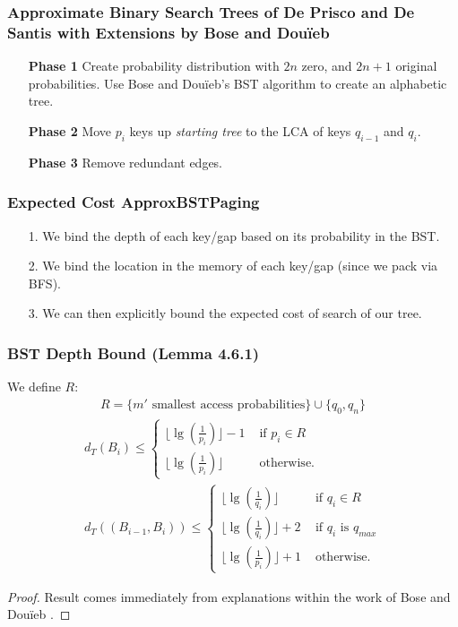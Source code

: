 \documentclass{beamer}
\theoremstyle{plain}
\begin{document}
\begin{frame} \frametitle{Approximate Binary Search Trees of De Prisco and De Santis with Extensions by Bose and Dou\"{i}eb} \label{sec:deBST}

\begin{itemize}
\item[\textbf{Phase 1}] Create probability distribution with $2n$ zero, and $2n+1$ original probabilities. Use Bose and Dou\"{i}eb's BST algorithm to create an alphabetic tree.

\item[\textbf{Phase 2}] Move $p_i$ keys up \textit{starting tree} to the LCA of keys $q_{i-1}$ and $q_i$.

\item[\textbf{Phase 3}] Remove redundant edges.
\end{itemize}
\end{frame}


\begin{frame} \frametitle{Expected Cost ApproxBSTPaging}\label{48}
\begin{itemize}
\item[1.] We bind the depth of each key/gap based on its probability in the BST.
\item[2.] We bind the location in the memory of each key/gap (since we pack via BFS).
\item[3.] We can then explicitly bound the expected cost of search of our tree.
\end{itemize}
\end{frame}

\begin{frame}\frametitle{BST Depth Bound (Lemma 4.6.1)}
We define $R$:
\begin{align*}
R = \{m' \text{ smallest access probabilities}\} \cup \{q_0, q_n\}
\end{align*}
\begin{align*} 
d_T(B_i) \leq
\begin{cases}  
\lfloor \lg(\frac{1}{p_i}) \rfloor - 1 &\text{ if } p_i \in R  \\
\lfloor \lg(\frac{1}{p_i}) \rfloor &\text{ otherwise.}
\end{cases} \\
d_T((B_{i-1},B_i)) \leq 
\begin{cases}  
\lfloor \lg(\frac{1}{q_i}) \rfloor &\text{ if } q_i \in R  \\
\lfloor \lg(\frac{1}{q_i}) \rfloor + 2 &\text{ if } q_i \text{ is } q_{max} \\
\lfloor \lg(\frac{1}{p_i}) \rfloor + 1 &\text{ otherwise.}
\end{cases}
\end{align*}


\begin{proof}
Result comes immediately from explanations within the work of Bose and Dou\"{i}eb \cite{bose2009efficient}.
\end{proof}

\end{frame}
\end{document}
